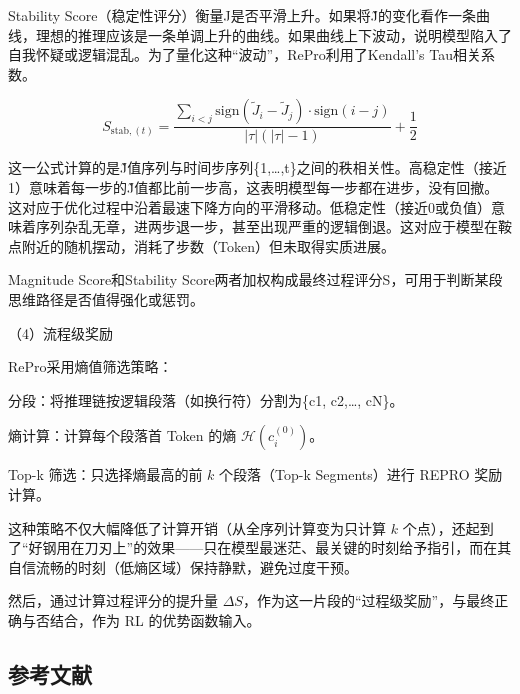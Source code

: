 Stability Score（稳定性评分）衡量J是否平滑上升。如果将J̃的变化看作一条曲线，理想的推理应该是一条单调上升的曲线。如果曲线上下波动，说明模型陷入了自我怀疑或逻辑混乱。为了量化这种``波动''，RePro利用了Kendall's Tau相关系数。

\[
S_{\mathrm{stab},(t)}
=
\frac{
\sum_{i < j}
\mathrm{sign}(\tilde{J}_i - \tilde{J}_j)\cdot \mathrm{sign}(i - j)
}{
|\tau|(|\tau| - 1)
}
+
\frac{1}{2}
\]

这一公式计算的是J̃值序列与时间步序列\{1,\ldots,t\}之间的秩相关性。高稳定性（接近1）意味着每一步的J̃值都比前一步高，这表明模型每一步都在进步，没有回撤。这对应于优化过程中沿着最速下降方向的平滑移动。低稳定性（接近0或负值）意味着序列杂乱无章，进两步退一步，甚至出现严重的逻辑倒退。这对应于模型在鞍点附近的随机摆动，消耗了步数（Token）但未取得实质进展。

Magnitude Score和Stability Score两者加权构成最终过程评分S，可用于判断某段思维路径是否值得强化或惩罚。

（4）流程级奖励

RePro采用熵值筛选策略：

分段：将推理链按逻辑段落（如换行符\n\n）分割为\{c1, c2,\ldots, cN\}。

熵计算：计算每个段落首 Token 的熵 \(\mathcal{H}(c_i^{(0)})\)。

Top-k 筛选：只选择熵最高的前 \(k\) 个段落（Top-k Segments）进行 REPRO 奖励计算。

这种策略不仅大幅降低了计算开销（从全序列计算变为只计算 \(k\) 个点），还起到了``好钢用在刀刃上''的效果------只在模型最迷茫、最关键的时刻给予指引，而在其自信流畅的时刻（低熵区域）保持静默，避免过度干预。

然后，通过计算过程评分的提升量 \(\Delta S\)，作为这一片段的``过程级奖励''，与最终正确与否结合，作为 RL 的优势函数输入。

\FloatBarrier
{}
\hypertarget{ux53c2ux8003ux6587ux732e-83}{%
\subsection{参考文献}\label{ux53c2ux8003ux6587ux732e-83}}

